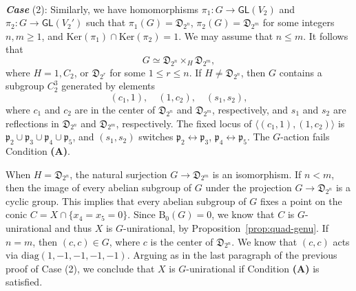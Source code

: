 \documentclass[12pt,reqno]{amsart}
\theoremstyle{plain}
\theoremstyle{remark}
\theoremstyle{definition}
\numberwithin{equation}{section}
\def\fD{{\mathfrak D}}
\def\GL{\mathsf{GL}}
\def\Ker{\mathrm{Ker}}
\begin{document}
\

{\bf\em Case} (2): Similarly, we have homomorphisms $\pi_1:G\to \GL(V_2)$ and $\pi_2:G\to \GL(V_2')$ such that $\pi_1(G)=\fD_{2^{n}}$, $\pi_2(G)=\fD_{2^m}$ for some integers $n,m\geq 1$, and $\Ker(\pi_1)\cap\Ker(\pi_2)=1$. We may assume that $n\leq m$. It follows that 
$$
G\simeq \fD_{2^{n}}\times_H\fD_{2^m},
$$
where $H=1,C_2$, or $\fD_{2^r}$ for some $1\leq r\leq n$. If $H\ne \fD_{2^n}$, then $G$ contains a subgroup $C_2^3$ generated by elements 
$$
(c_1,1),\quad (1,c_2),\quad (s_1,s_2),
$$
where $c_1$ and $c_2$ are in the center of $\fD_{2^n}$ and $\fD_{2^m}$, respectively, and $s_1$ and $s_2$ are reflections in $\fD_{2^n}$ and $\fD_{2^m}$, respectively. The fixed locus of $\langle(c_1,1),(1,c_2)\rangle$ is $\mathfrak p_2\cup\mathfrak p_3\cup\mathfrak p_4\cup\mathfrak p_5$, and $(s_1,s_2)$
switches $\mathfrak p_2\leftrightarrow\mathfrak p_3$, $\mathfrak p_4\leftrightarrow\mathfrak p_5$. The $G$-action fails Condition {\bf (A)}.

When $H=\fD_{2^n}$, the natural surjection $G\to \fD_{2^m}$ is an isomorphism. If $n<m$, then the image of every abelian subgroup of $G$ under the  projection $G\to \fD_{2^n}$ is a cyclic group. This implies that every abelian subgroup of $G$ fixes a point on the conic $C=X\cap\{x_4=x_5=0\}$. Since $\mathrm B_0(G)=0$, we know that  $C$ is $G$-unirational and thus $X$ is $G$-unirational, by Proposition~\ref{prop:quad-genu}.
If $n=m$, then $(c,c)\in G$, where $c$ is the center of $\fD_{2^n}.$ We know that $(c,c)$ acts via $\mathrm{diag}(1,-1,-1,-1,-1)$. Arguing as in the last paragraph of the previous proof of Case (2), we conclude that $X$ is $G$-unirational if Condition {\bf (A)} is satisfied.

\
\end{document}
